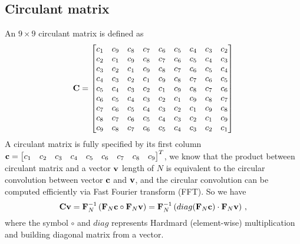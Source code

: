 \documentclass[revised,endfloat]{geophysics}
\begin{document}
\subsection{Circulant matrix}
An $9 \times 9$ circulant matrix is defined as
\begin{equation}
{\bf C} = 
\begin{bmatrix}
c_1 & c_9 & c_8 & c_7 & c_6 & c_5 &  c_4 & c_3 & c_2 \\ 
c_2 & c_1 & c_9 & c_8 & c_7 & c_6 &  c_5 & c_4 & c_3 \\ 
c_3 & c_2 & c_1 & c_9 & c_8 & c_7 &  c_6 & c_5 & c_4 \\ 
c_4 & c_3 & c_2 & c_1 & c_9 & c_8 &  c_7 & c_6 & c_5 \\ 
c_5 & c_4 & c_3 & c_2 & c_1 & c_9 &  c_8 & c_7 & c_6 \\ 
c_6 & c_5 & c_4 & c_3 & c_2 & c_1 &  c_9 & c_8 & c_7 \\ 
c_7 & c_6 & c_5 & c_4 & c_3 & c_2 &  c_1 & c_9 & c_8 \\ 
c_8 & c_7 & c_6 & c_5 & c_4 & c_3 &  c_2 & c_1 & c_9 \\ 
c_9 & c_8 & c_7 & c_6 & c_5 & c_4 &  c_3 & c_2 & c_1 \\ 
\end{bmatrix}
\end{equation} 
A circulant matrix is fully specified by its first column ${\bf c} = \begin{bmatrix}
c_1 & c_2 &  c_3 &  c_4 &  c_5 &  c_6 &  c_7 &  c_8 &  c_9  \end{bmatrix}^T$, we know that the product between circulant matrix and a vector ${\bf v}$ length of $N$ is equivalent to the circular convolution between vector ${\bf c}$ and ${\bf v}$, and the circular convolution can be computed efficiently via Fast Fourier transform (FFT). So we have
\begin{equation}
{\bf Cv} = {\bf F}_N^{-1} \left(  {\bf F}_N {\bf c} \circ {\bf F}_N {\bf v} \right)  =  {\bf F}_N^{-1} \left(  diag({\bf F}_N {\bf c}) \cdot {\bf F}_N {\bf v} \right) \,,
\end{equation}
where the symbol $\circ$ and $diag$ represents Hardmard (element-wise) multiplication and building diagonal matrix from a vector.
\end{document}

